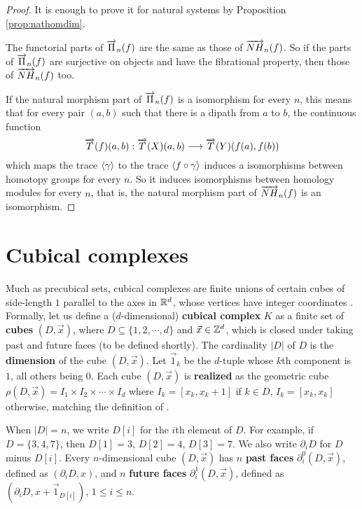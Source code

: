 \begin{proof}
It is enough to prove it for natural systems by Proposition \ref{prop:nathomdim}.

The functorial parts of $\overrightarrow{\Pi}_{n}(f)$ are the same as those of $\overrightarrow{NH}_{n}(f)$. So if the parts of $\overrightarrow{\Pi}_{n}(f)$ are surjective on objects and have the fibrational property, then those of $\overrightarrow{NH}_{n}(f)$ too.

If the natural morphism part of $\overrightarrow{\Pi}_{n}(f)$ is a isomorphism for every $n$, this means that for every pair $(a,b)$ such that there is a dipath from $a$ to $b$, the continuous function $$\overrightarrow{T}(f)(a,b) : \overrightarrow{T}(X)(a,b) \longrightarrow \overrightarrow{T}(Y)(f(a),f(b))$$
which maps the trace $\langle\gamma\rangle$ to the trace $\langle f\circ\gamma\rangle$ induces a isomorphisms between homotopy groups for every $n$. So it induces isomorphisms between homology modules for every $n$, that is, the natural morphism part of $\overrightarrow{NH}_{n}(f)$ is an isomorphism.
\end{proof}






\section{Cubical complexes}
\label{sec:cubcom}



Much as precubical sets, cubical complexes are finite unions of certain cubes of side-length
$1$ parallel to the axes in $\mathbb{R}^d$, whose vertices have integer
coordinates \cite{kaczynskil03}.  Formally, let us define a
($d$-dimensional) \textbf{cubical complex} $K$ as a finite set of
\textbf{cubes} $(D, \vec x)$, where $D \subseteq \{1, 2, \cdots, d\}$
and $\vec x \in \mathbb{Z}^d$, which is closed under taking past and future
faces (to be defined shortly).  The cardinality $\lvert D \rvert$ of $D$ is the
\textbf{dimension} of the cube $(D, \vec x)$.  Let $\vec 1_k$ be the
$d$-tuple whose $k$th component is $1$, all others being $0$.  Each
cube $(D, \vec x)$ is \textbf{realized} as the geometric cube $\rho (D,
\vec x) = I_1 \times I_2 \times \cdots \times I_d$ where $I_k = [x_k,
x_k+1]$ if $k \in D$, $I_k = [x_k, x_k]$ otherwise, matching the
definition of \cite{kaczynskil03}.

When $\lvert D \rvert =n$, we write $D [i]$ for the $i$th element of $D$.  For
example, if $D = \{3, 4, 7\}$, then $D[1]=3$, $D[2]=4$, $D[3]=7$.  We
also write $\partial_i D$ for $D$ minus $D[i]$.  Every $n$-dimensional
cube $(D, \vec x)$ has $n$ \textbf{past faces} $\partial_i^0 (D, \vec
x)$, defined as $(\partial_i D, x)$, and $n$ \textbf{future faces}
$\partial_i^1 (D, \vec x)$, defined as $(\partial_i D, x + \vec
1_{D[i]})$, $1\leq i \leq n$.


